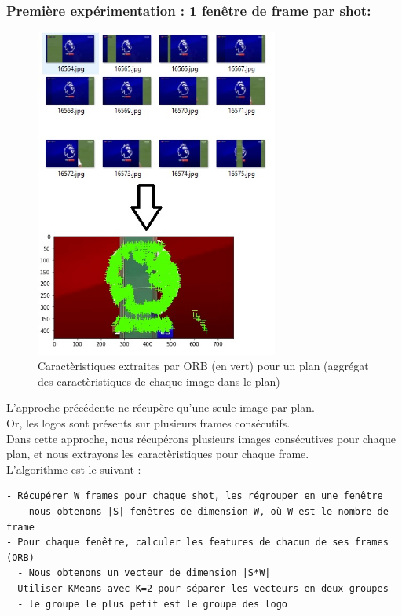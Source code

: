 \documentclass[11pt]{article}
\begin{document}
\subsubsection{Première expérimentation : 1 fenêtre de frame par shot:}
\label{sec:org6628e24}
\begin{figure}[htbp]
\centering
\includegraphics[width=8cm]{akaze_window_res.jpg}
\caption{Caractèristiques extraites par ORB (en vert) pour un plan (aggrégat des caractèristiques de chaque image dans le plan)}
\end{figure}
L'approche précédente ne récupère qu'une seule image par plan.\\
Or, les logos sont présents sur plusieurs frames consécutifs.\\
Dans cette approche, nous récupérons plusieurs images consécutives pour chaque plan, et nous extrayons les caractèristiques pour chaque frame.\\

L'algorithme est le suivant :\\
\begin{verbatim}
- Récupérer W frames pour chaque shot, les régrouper en une fenêtre
  - nous obtenons |S| fenêtres de dimension W, où W est le nombre de frame
- Pour chaque fenêtre, calculer les features de chacun de ses frames (ORB)
  - Nous obtenons un vecteur de dimension |S*W|
- Utiliser KMeans avec K=2 pour séparer les vecteurs en deux groupes
  - le groupe le plus petit est le groupe des logo
\end{verbatim}
\end{document}

